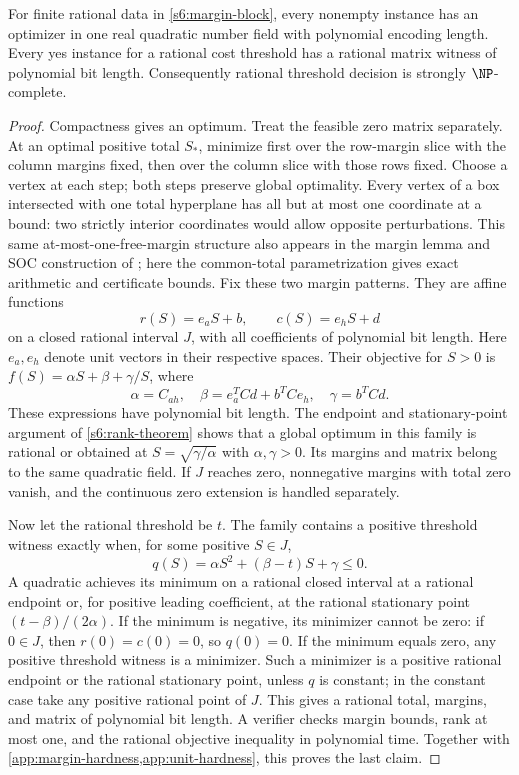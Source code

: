 \begin{theorem}
\label{app:margin-certificates}
For finite rational data in \eqref{s6:margin-block}, every nonempty
instance has an optimizer in one real quadratic number field with
polynomial encoding length. Every yes instance for a rational cost
threshold has a rational matrix witness of polynomial bit length.
Consequently rational threshold decision is strongly $\NP$-complete.
\end{theorem}
\begin{proof}
Compactness gives an optimum. Treat the feasible zero matrix separately.
At an optimal positive total $S_*$, minimize first over the row-margin
slice with the column margins fixed, then over the column slice with
those rows fixed. Choose a vertex at each step; both steps preserve
global optimality. Every vertex of a box intersected with one total
hyperplane has all but at most one coordinate at a bound: two strictly
interior coordinates would allow opposite perturbations. This same
at-most-one-free-margin structure also appears in the margin lemma and SOC
construction of \citet[Lemma~1 and the proof of Theorem~2]{s6:jalilian2026}; here the
common-total parametrization gives exact arithmetic and certificate bounds.
Fix these two
margin patterns. They are affine functions
\[
 r(S)=e_aS+b,\qquad c(S)=e_hS+d
\]
on a closed rational interval $J$, with all coefficients of polynomial
bit length. Here $e_a,e_h$ denote unit vectors in their respective spaces.
Their objective for $S>0$ is
$f(S)=\alpha S+\beta+\gamma/S$, where
\[
 \alpha=C_{ah},\quad
 \beta=e_a^TCd+b^TCe_h,\quad \gamma=b^TCd.
\]
These expressions have polynomial bit length. The endpoint and
stationary-point argument of \cref{s6:rank-theorem} shows that a global
optimum in this family is rational or obtained at
$S=\sqrt{\gamma/\alpha}$ with $\alpha,\gamma>0$. Its margins and
matrix belong to the same quadratic field. If $J$ reaches zero,
nonnegative margins with total zero vanish, and the continuous
zero extension is handled separately.

Now let the rational threshold be $t$. The family contains a positive
threshold witness exactly when, for some positive $S\in J$,
\[
 q(S)=\alpha S^2+(\beta-t)S+\gamma\le0.
\]
A quadratic achieves its minimum on a rational closed interval at a
rational endpoint or, for positive leading coefficient, at the rational
stationary point $(t-\beta)/(2\alpha)$. If the minimum is negative,
its minimizer cannot be zero: if $0\in J$, then $r(0)=c(0)=0$, so
$q(0)=0$. If the minimum equals zero, any positive threshold witness is
a minimizer. Such a minimizer is a positive rational endpoint or the
rational stationary point, unless $q$ is constant; in the constant case
take any positive rational point of $J$. This gives a rational total,
margins, and matrix of polynomial bit length.
A verifier checks margin bounds, rank at most one, and the rational
objective inequality in polynomial time. Together with
\cref{app:margin-hardness,app:unit-hardness}, this proves the last claim.
\end{proof}

